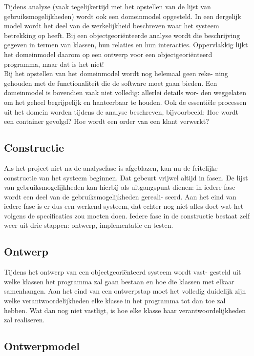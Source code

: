 \documentclass{article}
\begin{document}
	Tijdens analyse (vaak tegelijkertijd met het opstellen van de lijst van
	gebruiksmogelijkheden) wordt ook een domeinmodel opgesteld. In een
	dergelijk model wordt het deel van de werkelijkheid beschreven waar
	het systeem betrekking op heeft. Bij een objectgeoriënteerde analyse
	wordt die beschrijving gegeven in termen van klassen, hun relaties en
	hun interacties. Oppervlakkig lijkt het domeinmodel daarom op een
	ontwerp voor een objectgeoriënteerd programma, maar dat is het niet! \\
	Bij het opstellen van het domeinmodel wordt nog helemaal geen reke-
	ning gehouden met de functionaliteit die de software moet gaan bieden.
	Een domeinmodel is bovendien vaak niet volledig: allerlei details wor-
	den weggelaten om het geheel begrijpelijk en hanteerbaar te houden.
	Ook de essentiële processen uit het domein worden tijdens de analyse
	beschreven, bijvoorbeeld: Hoe wordt een container gevolgd? Hoe wordt
	een order van een klant verwerkt? \\
	
	\subsection{Constructie}
	
	Als het project niet na de analysefase is afgeblazen, kan nu de feitelijke
	constructie van het systeem beginnen. Dat gebeurt vrijwel altijd in fasen.
	De lijst van gebruiksmogelijkheden kan hierbij als uitgangspunt dienen:
	in iedere fase wordt een deel van de gebruiksmogelijkheden gereali-
	seerd. Aan het eind van iedere fase is er dus een werkend systeem, dat
	echter nog niet alles doet wat het volgens de specificaties zou moeten
	doen. Iedere fase in de constructie bestaat zelf weer uit drie stappen:
	ontwerp, implementatie en testen.
	
	\subsection{Ontwerp}
	
	Tijdens het ontwerp van een objectgeoriënteerd systeem wordt vast-
	gesteld uit welke klassen het programma zal gaan bestaan en hoe die
	klassen met elkaar samenhangen. Aan het eind van een ontwerpstap
	moet het volledig duidelijk zijn welke verantwoordelijkheden elke klasse
	in het programma tot dan toe zal hebben. Wat dan nog niet vastligt, is hoe elke klasse haar verantwoordelijkheden zal realiseren. 
	
	\subsection{Ontwerpmodel}
	
\end{document}
